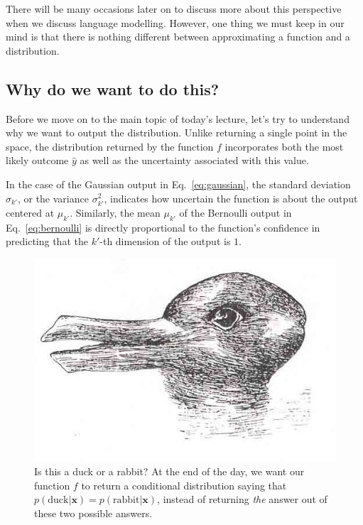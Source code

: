 \documentclass{report}
\newcommand{\vect}[1]{\mathbf{#1}}
\newcommand{\vx}[0]{\vect{x}}
\begin{document}
There will be many occasions later on to discuss more about this perspective
when we discuss language modelling. However, one thing we must keep in our mind
is that there is nothing different between approximating a function and a
distribution.

\subsection{Why do we want to do this?}

Before we move on to the main topic of today's lecture, let's try to understand
why we want to output the distribution. Unlike returning a single point in the
space, the distribution returned by the function $f$ incorporates both the most
likely outcome $\hat{y}$ as well as the uncertainty associated with this value.

In the case of the Gaussian output in Eq.~\eqref{eq:gaussian}, the standard
deviation $\sigma_{k'}$, or the variance $\sigma_{k'}^2$, indicates how
uncertain the function is about the output centered at $\mu_{k'}$. Similarly,
the mean $\mu_{k'}$ of the Bernoulli output in Eq.~\eqref{eq:bernoulli} is
directly proportional to the function's confidence in predicting that the
$k'$-th dimension of the output is $1$.

\begin{figure}[ht]
    \centering
    \begin{minipage}{0.6\textwidth}
        \includegraphics[width=\columnwidth]{figures/duck_rabbit.png}
    \end{minipage}
    \hfill
    \begin{minipage}{0.39\textwidth}
        \caption{Is this a duck or a rabbit? \cite{kuhn2012structure} At the end
        of the day, we want our function $f$ to return a conditional
    distribution saying that $p(\text{duck}|\vx) = p(\text{rabbit}|\vx)$,
instead of returning {\em the} answer out of these two possible answers.}
        \label{fig:duck_rabbit}
    \end{minipage}
\end{figure}
\end{document}
